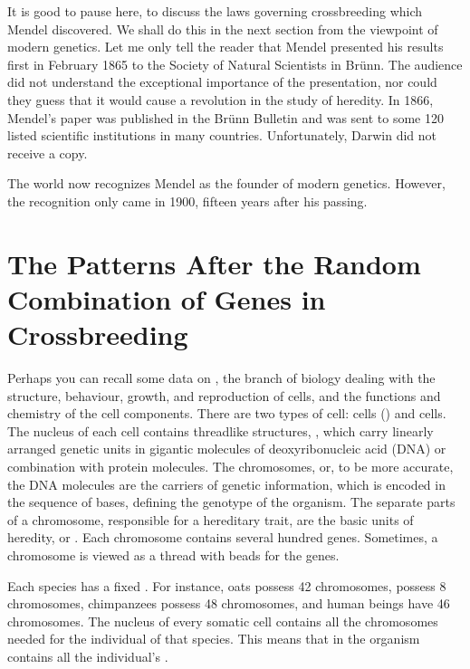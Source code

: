 It is good to pause here, to discuss the laws governing crossbreeding
which Mendel discovered. We shall do this in the next section from the
viewpoint of modern genetics. Let me only tell the reader that Mendel
presented his results first in February 1865 to the Society of Natural
Scientists in Br\"unn. The audience did not understand the exceptional
importance of the presentation, nor could they guess that it would cause
a revolution in the study of heredity. In 1866, Mendel's paper was published
in the Br\"unn Bulletin and was sent to some 120 listed scientific
institutions in many countries. Unfortunately, Darwin did not receive
a copy.

The world now recognizes Mendel as the founder of modern genetics.
However, the recognition only came in 1900, fifteen years after his
passing.

\section{The Patterns After the Random Combination of Genes in Crossbreeding}

 Perhaps you can recall some data on , the branch of biology dealing with the structure, behaviour, growth, and reproduction of cells, and the functions and chemistry of the cell components. There are two types of cell:  cells () and  cells. The nucleus of each cell contains threadlike structures, , which carry linearly arranged genetic units in gigantic molecules of deoxyribonucleic acid (DNA) or combination with protein molecules. The chromosomes, or, to be more accurate, the DNA molecules are the carriers of genetic information, which is encoded in the sequence of bases, defining the genotype of the organism. The separate parts of a chromosome, responsible for a hereditary trait, are
the basic units of heredity, or . Each chromosome contains several hundred genes. Sometimes, a chromosome is viewed as a thread with beads for the genes.

Each species has a fixed . For instance, oats possess 42 chromosomes,  possess 8 chromosomes, chimpanzees possess 48 chromosomes, and human beings have 46 chromosomes. The nucleus of every somatic cell contains all the chromosomes needed for the individual of that species. This means that  in the organism contains all the individual's .

